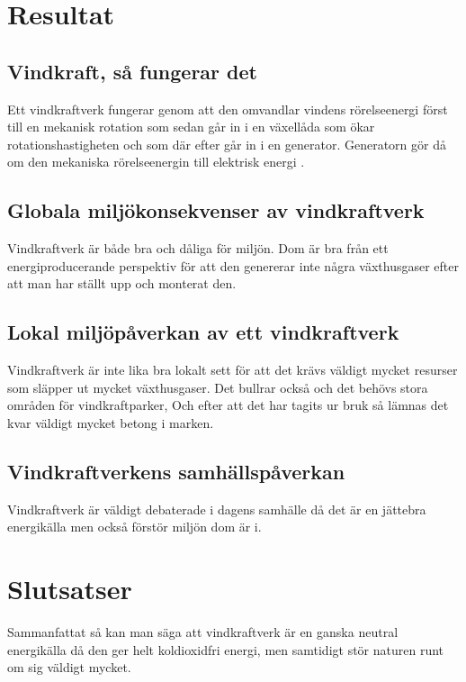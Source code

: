 \documentclass[11p]{article}
\begin{document}
    \section{Resultat}

    \subsection{Vindkraft, så fungerar det}
    Ett vindkraftverk fungerar genom att den omvandlar vindens rörelseenergi först till en mekanisk
    rotation som sedan går in i en växellåda som ökar rotationshastigheten och som där efter går in i en generator.
    Generatorn gör då om den mekaniska rörelseenergin till elektrisk energi \parencite[sid 267]{Fraenkel}.

    \subsection{Globala miljökonsekvenser av vindkraftverk}
    Vindkraftverk är både bra och dåliga för miljön. Dom är bra från ett energiproducerande perspektiv
    för att den genererar inte några växthusgaser efter att man har ställt upp och monterat den.

    \subsection{Lokal miljöpåverkan av ett vindkraftverk}
    Vindkraftverk är inte lika bra lokalt sett för att det krävs väldigt mycket resurser som släpper ut mycket växthusgaser.
    Det bullrar också och det behövs stora områden för vindkraftparker, Och efter att det har tagits ur bruk så lämnas det kvar väldigt mycket betong i marken.

    \subsection{Vindkraftverkens samhällspåverkan}
    Vindkraftverk är väldigt debaterade i dagens samhälle då det är en jättebra energikälla men också förstör miljön dom är i.

    \section{Slutsatser}
    Sammanfattat så kan man säga att vindkraftverk är en ganska neutral energikälla då den ger helt koldioxidfri energi,
    men samtidigt stör naturen runt om sig väldigt mycket.
    \printbibliography
\end{document}
